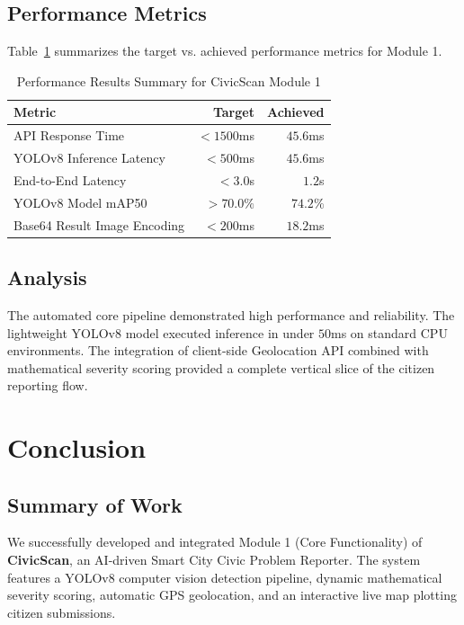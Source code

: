 \documentclass{tietreport}
\begin{document}
\section{Performance Metrics}

Table~\ref{tab:performance} summarizes the target vs. achieved performance metrics for Module 1.

\begin{table}[h]
\centering
\begin{tabular}{|l|r|r|}
  \hline
  \textbf{Metric} & \textbf{Target} & \textbf{Achieved} \\
  \hline
  API Response Time & $< 1500$ms & $45.6$ms \\
  \hline
  YOLOv8 Inference Latency & $< 500$ms & $45.6$ms \\
  \hline
  End-to-End Latency & $< 3.0$s & $1.2$s \\
  \hline
  YOLOv8 Model mAP50 & $> 70.0\%$ & $74.2\%$ \\
  \hline
  Base64 Result Image Encoding & $< 200$ms & $18.2$ms \\
  \hline
\end{tabular}
\caption{Performance Results Summary for CivicScan Module 1}
\label{tab:performance}
\end{table}

\section{Analysis}

The automated core pipeline demonstrated high performance and reliability. The lightweight YOLOv8 model executed inference in under $50$ms on standard CPU environments. The integration of client-side Geolocation API combined with mathematical severity scoring provided a complete vertical slice of the citizen reporting flow.



\chapter{Conclusion}

\section{Summary of Work}

We successfully developed and integrated Module 1 (Core Functionality) of \textbf{CivicScan}, an AI-driven Smart City Civic Problem Reporter. The system features a YOLOv8 computer vision detection pipeline, dynamic mathematical severity scoring, automatic GPS geolocation, and an interactive live map plotting citizen submissions.
\end{document}
